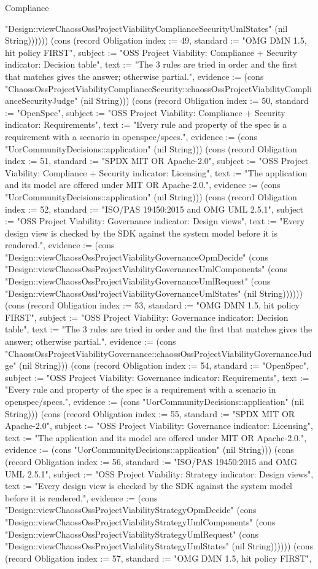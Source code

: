 \begin{lexlean}{Compliance}
\begin{semanticmodule}
{"Design::viewChaossOssProjectViabilityComplianceSecurityUmlStates" (nil String)))))}) (cons (record Obligation {index := 49, standard := "OMG DMN 1.5, hit policy FIRST", subject := "OSS Project Viability: Compliance + Security indicator: Decision table", text := "The 3 rules are tried in order and the first that matches gives the answer; otherwise partial.", evidence := (cons "ChaossOssProjectViabilityComplianceSecurity::chaossOssProjectViabilityComplianceSecurityJudge" (nil String))}) (cons (record Obligation {index := 50, standard := "OpenSpec", subject := "OSS Project Viability: Compliance + Security indicator: Requirements", text := "Every rule and property of the spec is a requirement with a scenario in openspec/specs.", evidence := (cons "UorCommunityDecisions::application" (nil String))}) (cons (record Obligation {index := 51, standard := "SPDX MIT OR Apache-2.0", subject := "OSS Project Viability: Compliance + Security indicator: Licensing", text := "The application and its model are offered under MIT OR Apache-2.0.", evidence := (cons "UorCommunityDecisions::application" (nil String))}) (cons (record Obligation {index := 52, standard := "ISO/PAS 19450:2015 and OMG UML 2.5.1", subject := "OSS Project Viability: Governance indicator: Design views", text := "Every design view is checked by the SDK against the system model before it is rendered.", evidence := (cons "Design::viewChaossOssProjectViabilityGovernanceOpmDecide" (cons "Design::viewChaossOssProjectViabilityGovernanceUmlComponents" (cons "Design::viewChaossOssProjectViabilityGovernanceUmlRequest" (cons "Design::viewChaossOssProjectViabilityGovernanceUmlStates" (nil String)))))}) (cons (record Obligation {index := 53, standard := "OMG DMN 1.5, hit policy FIRST", subject := "OSS Project Viability: Governance indicator: Decision table", text := "The 3 rules are tried in order and the first that matches gives the answer; otherwise partial.", evidence := (cons "ChaossOssProjectViabilityGovernance::chaossOssProjectViabilityGovernanceJudge" (nil String))}) (cons (record Obligation {index := 54, standard := "OpenSpec", subject := "OSS Project Viability: Governance indicator: Requirements", text := "Every rule and property of the spec is a requirement with a scenario in openspec/specs.", evidence := (cons "UorCommunityDecisions::application" (nil String))}) (cons (record Obligation {index := 55, standard := "SPDX MIT OR Apache-2.0", subject := "OSS Project Viability: Governance indicator: Licensing", text := "The application and its model are offered under MIT OR Apache-2.0.", evidence := (cons "UorCommunityDecisions::application" (nil String))}) (cons (record Obligation {index := 56, standard := "ISO/PAS 19450:2015 and OMG UML 2.5.1", subject := "OSS Project Viability: Strategy indicator: Design views", text := "Every design view is checked by the SDK against the system model before it is rendered.", evidence := (cons "Design::viewChaossOssProjectViabilityStrategyOpmDecide" (cons "Design::viewChaossOssProjectViabilityStrategyUmlComponents" (cons "Design::viewChaossOssProjectViabilityStrategyUmlRequest" (cons "Design::viewChaossOssProjectViabilityStrategyUmlStates" (nil String)))))}) (cons (record Obligation {index := 57, standard := "OMG DMN 1.5, hit policy FIRST", }
\end{semanticmodule}
\end{lexlean}

